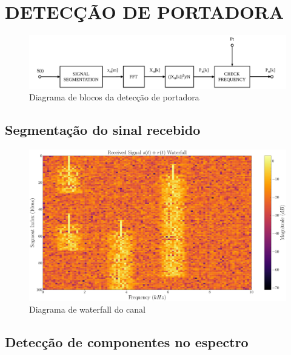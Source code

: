 \section{DETECÇÃO DE PORTADORA}\label{sec:detector}

\begin{figure}[H]
	\centering
	\caption{Diagrama de blocos da detecção de portadora}\label{fig:detector_diagram}
	\includegraphics[width=\linewidth]{assets/diagrams/detector.pdf}
\end{figure}

\subsection{Segmentação do sinal recebido}\label{sec:segmentacao}

\begin{figure}[H]
	\centering
	\caption{Diagrama de waterfall do canal}\label{fig:waterfall}
	\includegraphics[width=\linewidth]{assets/cap3/example_detector_waterfall.pdf}
\end{figure}


\subsection{Detecção de componentes no espectro}\label{sec:comparacao_potencia}

